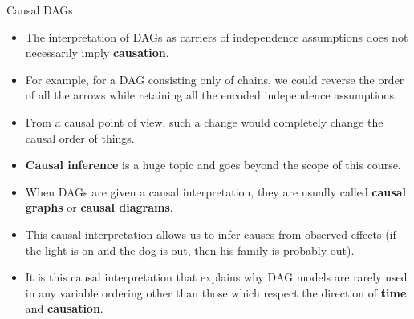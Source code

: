 \documentclass[handout]{beamer}
\begin{document}
\begin{frame}{Causal DAGs}
\scriptsize{
\begin{itemize}


\item The interpretation of DAGs as carriers of independence assumptions does not necessarily imply \textbf{causation}.

\item For example, for a DAG consisting only of chains, we could reverse the order of all the arrows while retaining all the encoded independence assumptions.

\item From a causal point of view, such a change would completely change the causal order of things.

\item \textbf{Causal inference} is a huge topic and goes beyond the scope of this course.

\item When DAGs are given a causal interpretation, they are usually called \textbf{causal graphs} or \textbf{causal diagrams}.


\item This causal interpretation allows us to infer causes from observed effects (if the light is on and the dog is out, then his family is probably out).

\item It is this causal interpretation that explains why DAG models are rarely used in any variable ordering other than those which respect the direction of \textbf{time} and \textbf{causation}. \cite{pearl2009causality}

\end{itemize}



} 

\end{frame}
\end{document}
